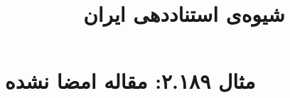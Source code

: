\documentclass[a4paper,10pt]{article}
\begin{document}
\title{شیوه‌ی استناددهی ایران
 }
\author{}
\date{}
\maketitle



\section*{مثال ۲.۱۸۹: مقاله امضا نشده}

\cite{همشهری1385}\\
\cite{nytimes2002}\\






\end{document}
